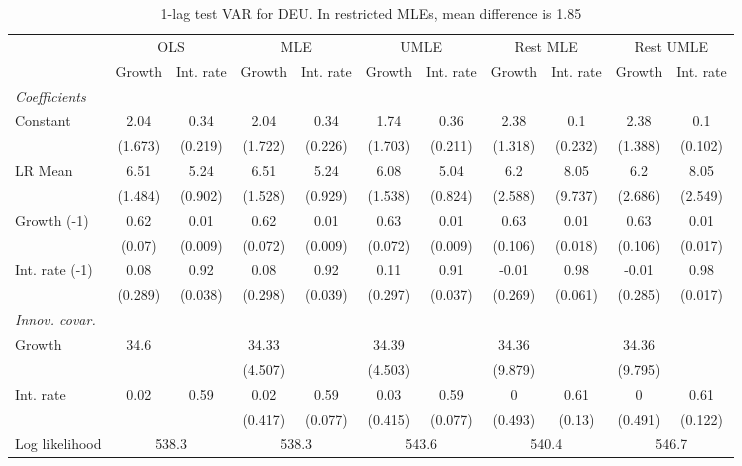 \begin{table}[htbp] 
	\centering
	\begin{tabular}{@{\extracolsep{4pt}}lcccccccccc@{}}		\hline\hline
		 		 & \multicolumn{2}{c}{OLS} &\multicolumn{2}{c}{MLE} &\multicolumn{2}{c}{UMLE} &\multicolumn{2}{c}{Rest MLE} &\multicolumn{2}{c}{Rest UMLE} \\ 
 		 & Growth 	 & Int. rate 	 & Growth 	 & Int. rate 	 & Growth 	 & Int. rate 	 & Growth 	 & Int. rate 	 & Growth 	 & Int. rate\\\cline{2-3}\cline{4-5}\cline{6-7}\cline{8-9}\cline{10-11}
\rule{0pt}{4ex} 
 \emph{Coefficients} 	  		 & 		 & 		 & 		 & 		 & 		 & 		 & 		 & 		 & 		 &\\ 
\quad Constant 	 & 2.04 	 & 0.34 	 & 2.04 	 & 0.34 	 & 1.74 	 & 0.36 	 & 2.38 	 & 0.1 	 & 2.38 	 & 0.1	 \\ 
 		 & (1.673) 	 & (0.219) 	 & (1.722) 	 & (0.226) 	 & (1.703) 	 & (0.211) 	 & (1.318) 	 & (0.232) 	 & (1.388) 	 & (0.102) 	 \\ 
\quad LR Mean 	 & 6.51 	 & 5.24 	 & 6.51 	 & 5.24 	 & 6.08 	 & 5.04 	 & 6.2 	 & 8.05 	 & 6.2 	 & 8.05	 \\ 
 		 & (1.484) 	 & (0.902) 	 & (1.528) 	 & (0.929) 	 & (1.538) 	 & (0.824) 	 & (2.588) 	 & (9.737) 	 & (2.686) 	 & (2.549) 	 \\ 
\quad Growth (-1) 	 &0.62 	 & 0.01 	 & 0.62 	 & 0.01 	 & 0.63 	 & 0.01 	 & 0.63 	 & 0.01 	 & 0.63 	 & 0.01	 \\ 
 		 & (0.07) 	 & (0.009) 	 & (0.072) 	 & (0.009) 	 & (0.072) 	 & (0.009) 	 & (0.106) 	 & (0.018) 	 & (0.106) 	 & (0.017) 	 \\ 
\quad Int. rate (-1) 	 &0.08 	 & 0.92 	 & 0.08 	 & 0.92 	 & 0.11 	 & 0.91 	 & -0.01 	 & 0.98 	 & -0.01 	 & 0.98	 \\ 
 		 & (0.289) 	 & (0.038) 	 & (0.298) 	 & (0.039) 	 & (0.297) 	 & (0.037) 	 & (0.269) 	 & (0.061) 	 & (0.285) 	 & (0.017) 	 \\ 
\rule{0pt}{4ex} \emph{Innov. covar.}  	 & 	 & 	 & 	 & 	 & 	 & 	 & 	 & 	 & 	 &\\ 
\quad Growth 	 &34.6 	 &  	 & 34.33 	 &  	 & 34.39 	 &  	 & 34.36 	 &  	 & 34.36 	 & 	 \\ 
 		 &  	 &  	 & (4.507) 	 &  	 & (4.503) 	 &  	 & (9.879) 	 &  	 & (9.795) 	 &  	 \\ 
\quad Int. rate 	 &0.02 	 & 0.59 	 & 0.02 	 & 0.59 	 & 0.03 	 & 0.59 	 & 0 	 & 0.61 	 & 0 	 & 0.61	 \\ 
 		 &  	 &  	 & (0.417) 	 & (0.077) 	 & (0.415) 	 & (0.077) 	 & (0.493) 	 & (0.13) 	 & (0.491) 	 & (0.122) 	 \\ 
 \hline \rule{0pt}{4ex} 
  Log likelihood 	 &\multicolumn{2}{c}{538.3} 	 & \multicolumn{2}{c}{538.3} 	 & \multicolumn{2}{c}{543.6} 	 & \multicolumn{2}{c}{540.4} 	 & \multicolumn{2}{c}{546.7}\\ 

 \hline 	\end{tabular}		\caption{1-lag test VAR for DEU. In restricted MLEs, mean difference is 1.85}
		\label{tab:DEU1}

\end{table}